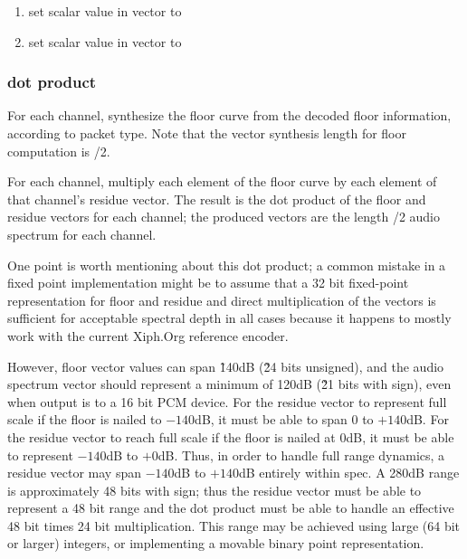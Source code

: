 \begin{enumerate}
\begin{enumerate}
\begin{enumerate}
    \end{enumerate}

   \item set scalar value \varname{[M]} in vector  to \varname{[new_M]}
   \item set scalar value \varname{[A]} in vector  to \varname{[new_A]}
  \end{enumerate}

\end{enumerate}




\subsubsection{dot product}

For each channel, synthesize the floor curve from the decoded floor
information, according to packet type. Note that the vector synthesis
length for floor computation is \varname{[n]}/2.

For each channel, multiply each element of the floor curve by each
element of that channel's residue vector.  The result is the dot
product of the floor and residue vectors for each channel; the produced
vectors are the length \varname{[n]}/2 audio spectrum for each
channel.

One point is worth mentioning about this dot product; a common mistake
in a fixed point implementation might be to assume that a 32 bit
fixed-point representation for floor and residue and direct
multiplication of the vectors is sufficient for acceptable spectral
depth in all cases because it happens to mostly work with the current
Xiph.Org reference encoder.

However, floor vector values can span \~140dB (\~24 bits unsigned), and
the audio spectrum vector should represent a minimum of 120dB (\~21
bits with sign), even when output is to a 16 bit PCM device.  For the
residue vector to represent full scale if the floor is nailed to
$-140$dB, it must be able to span 0 to $+140$dB.  For the residue vector
to reach full scale if the floor is nailed at 0dB, it must be able to
represent $-140$dB to $+0$dB.  Thus, in order to handle full range
dynamics, a residue vector may span $-140$dB to $+140$dB entirely within
spec.  A 280dB range is approximately 48 bits with sign; thus the
residue vector must be able to represent a 48 bit range and the dot
product must be able to handle an effective 48 bit times 24 bit
multiplication.  This range may be achieved using large (64 bit or
larger) integers, or implementing a movable binary point
representation.



